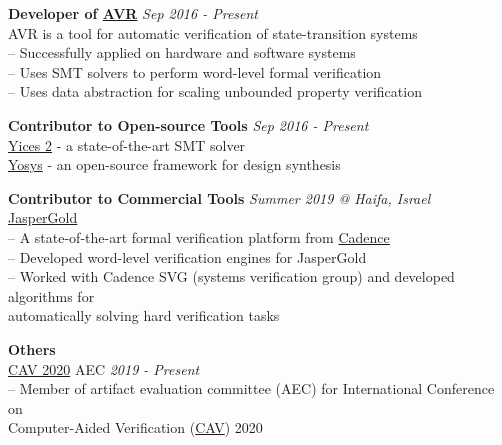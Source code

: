 \documentclass[margin,line,letter]{resume}
\begin{document}
\begin{resume}
    \textbf{Developer of \href{https://github.com/aman-goel/avr}{\textbf{AVR}}} \hfill \emph{Sep 2016 - Present}\\
    \phantom{xx}\hspace{1ex} AVR is a tool for automatic verification of state-transition systems \\
    \phantom{xx}\hspace{1ex} -- Successfully applied on hardware and software systems \\
    \phantom{xx}\hspace{1ex} -- Uses SMT solvers to perform word-level formal verification \\
    \phantom{xx}\hspace{1ex} -- Uses data abstraction for scaling unbounded property verification
    
    \textbf{Contributor to Open-source Tools} \hfill \emph{Sep 2016 - Present}\\ 
    \phantom{xx}\hspace{1ex} \href{https://github.com/SRI-CSL/yices2}{Yices 2} - a state-of-the-art SMT solver \\
    \phantom{xx}\hspace{1ex} \href{https://github.com/YosysHQ/yosys}{Yosys} - an open-source framework for design synthesis

    \textbf{Contributor to Commercial Tools} \hfill \emph{Summer 2019 @ Haifa, Israel}\\ 
    \phantom{xx}\hspace{1ex} \href{https://www.cadence.com/content/cadence-www/global/en_US/home/tools/system-design-and-verification/formal-and-static-verification/jasper-gold-verification-platform.html}{JasperGold} \\
    \phantom{xx}\hspace{1ex} -- A state-of-the-art formal verification platform from \href{https://www.cadence.com/}{Cadence} \\
    \phantom{xx}\hspace{1ex} -- Developed word-level verification engines for JasperGold \\
    \phantom{xx}\hspace{1ex} -- Worked with Cadence SVG (systems verification group) and developed algorithms for \\
    \phantom{xx}\hspace{3ex} automatically solving hard verification tasks

    \textbf{Others}\\ 
    \phantom{xx}\hspace{1ex}
    \href{http://i-cav.org/2020/}{CAV 2020} AEC \hfill \emph{2019 - Present}\\
    \phantom{xx}\hspace{1ex} -- Member of artifact evaluation committee (AEC) for International Conference on \\
    \phantom{xx}\hspace{3ex} Computer-Aided Verification (\href{http://i-cav.org/2020/}{CAV}) 2020


\end{resume}
\end{document}
